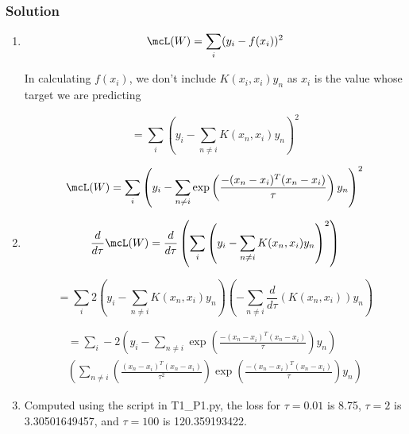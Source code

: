 \documentclass[submit]{harvardml}
\begin{document}
\newpage
\subsubsection*{Solution}

\begin{enumerate}

  \item 
  
  \begin{equation*}
    \mcL(W) = \sum_{i} (y_i - f(x_i))^2
  \end{equation*}

  In calculating $f(x_i)$, we don't include $K(x_i, x_i)y_n$ as $x_i$ is the value whose
  target we are predicting

  \begin{equation*}
    = \sum_{i} \left(y_i - \sum_{n\neq i} K(x_n, x_i) y_n \right)^2 
  \end{equation*}


  \begin{equation*}
    \mcL(W) = \sum_{i} \left(y_i - \sum_{n\neq i} \exp\left(\frac{-(x_n-x_i)^T (x_n-x_i)}{\tau} \right) y_n\right)^2 
  \end{equation*}

  \item 
  
  \begin{equation*}
    \frac{d}{d\tau}  \mcL(W)  = 
    \frac{d}{d\tau} \left( \sum_{i} \left(y_i - \sum_{n\neq i} K(x_n, x_i) y_n \right)^2 \right)
  \end{equation*}

  \begin{equation*}
    =  \sum_{i}  2 \left(y_i - \sum_{n\neq i} K(x_n, x_i) y_n \right) 
    \left(- \sum_{n\neq i}  \frac{d}{d\tau} \left( K(x_n, x_i) \right) y_n \right) 
  \end{equation*}


  \begin{multline*}
    =  
    \sum_{i}  - 2 \left(y_i - \sum_{n\neq i} \exp\left(\frac{-(x_n-x_i)^T (x_n-x_i)}{\tau} \right) y_n\right) \\
    \left( \sum_{n\neq i} \left(\frac{(x_n-x_i)^T (x_n-x_i)}{\tau^2} \right) \exp\left(\frac{-(x_n-x_i)^T (x_n-x_i)}{\tau} \right)  y_n\right) 
  \end{multline*}

  \item

  Computed using the script in T1\_P1.py, the loss for $\tau=0.01$ is 8.75, $\tau=2$ is 3.30501649457,
  and $\tau=100$ is 120.359193422. 


\end{enumerate}
\end{document}
